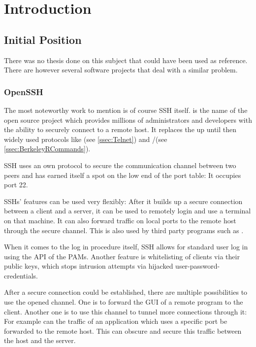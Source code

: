 \documentclass[10pt,a4paper,titlepage,twoside,english,final]{zhawreprt}
\begin{document}
\makedeclarationoforiginality

\tableofcontents

\chapter{Introduction}\label{chp:Introduction}
\section{Initial Position}\label{sec:InitialPosition}
There was no thesis done on this subject that could have been used as reference. There are however several software projects that deal with a similar problem.

\subsection{OpenSSH}\label{ssec:OpenSSH}
The most noteworthy work to mention is of course \gls{SSH} itself. \cite{openssh} is the name of the open source project which provides millions of administrators and developers with the ability to securely connect to a remote host. It replaces the up until then widely used protocols like \cite{telnet}(see \ref{ssec:Telnet}) and \cite{rlogin}/\cite{rsh}(see \ref{ssec:BerkeleyRCommands}).

\gls{SSH} uses an own protocol to secure the communication channel between two peers and has earned itself a spot on the low end of the \gls{port} table: It occupies \gls{port} 22.

\gls{SSH}s' features can be used very flexibly: After it builds up a secure connection between a client and a server, it can be used to remotely login and use a \gls{terminal} on that machine.
It can also forward traffic on local ports to the remote host through the secure channel. This is also used by third party programs such as \cite{rsync}.

When it comes to the log in procedure itself, \gls{SSH} allows for standard user log in using the \gls{API} of the \glspl{PAM}. Another feature is whitelisting of clients via their public keys, which stops intrusion attempts via hijacked user-password-credentials.

After a secure connection could be established, there are multiple possibilities to use the opened channel. One is to forward the \gls{GUI} of a remote program to the client. Another one is to use this channel to tunnel more connections through it: For example can the traffic of an application which uses a specific \gls{port} be forwarded to the remote host. This can obscure and secure this traffic between the host and the server.
\end{document}
